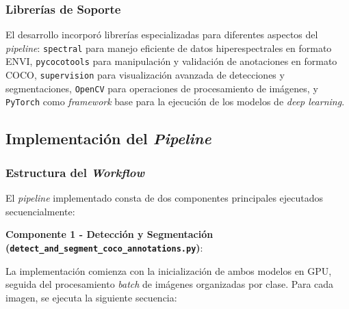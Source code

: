 \subsubsection{Librerías de Soporte}

El desarrollo incorporó librerías especializadas para diferentes aspectos del \emph{pipeline}: \texttt{spectral} para manejo eficiente de datos hiperespectrales en formato ENVI, \texttt{pycocotools} para manipulación y validación de anotaciones en formato COCO, \texttt{supervision} para visualización avanzada de detecciones y segmentaciones, \texttt{OpenCV} para operaciones de procesamiento de imágenes, y \texttt{PyTorch} como \emph{framework} base para la ejecución de los modelos de \emph{deep learning}.



\subsection{Implementación del \emph{Pipeline}}

\subsubsection{Estructura del \emph{Workflow}}


El \emph{pipeline} implementado consta de dos componentes principales ejecutados secuencialmente:

\textbf{Componente 1 - Detección y Segmentación (\texttt{detect\_and\_segment\_coco\_annotations.py})}:

La implementación comienza con la inicialización de ambos modelos en GPU, seguida del procesamiento \emph{batch} de imágenes organizadas por clase. Para cada imagen, se ejecuta la siguiente secuencia:

